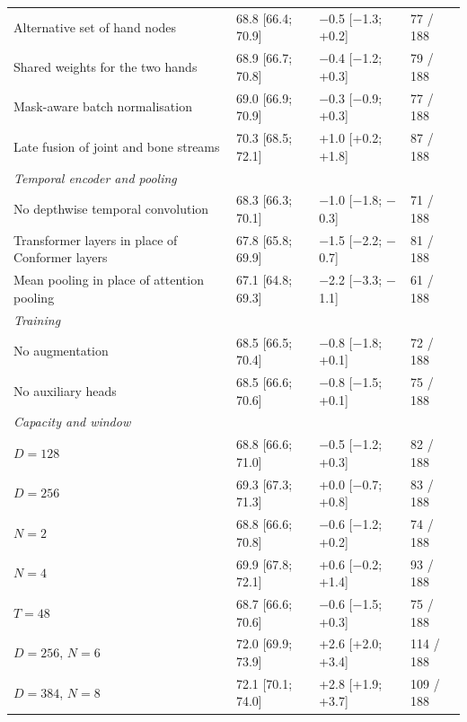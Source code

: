 \documentclass[a4paper,10pt]{article}
\begin{document}
\begin{table}[H]
\begin{tabular}{llll}
Alternative set of hand nodes & 68.8 [66.4; 70.9] & $-$0.5 [$-$1.3; +0.2] & 77 / 188 \\
Shared weights for the two hands & 68.9 [66.7; 70.8] & $-$0.4 [$-$1.2; +0.3] & 79 / 188 \\
Mask-aware batch normalisation & 69.0 [66.9; 70.9] & $-$0.3 [$-$0.9; +0.3] & 77 / 188 \\
Late fusion of joint and bone streams & 70.3 [68.5; 72.1] & +1.0 [+0.2; +1.8] & 87 / 188 \\
\multicolumn{4}{l}{\textit{Temporal encoder and pooling}} \\
No depthwise temporal convolution & 68.3 [66.3; 70.1] & $-$1.0 [$-$1.8; $-$0.3] & 71 / 188 \\
Transformer layers in place of Conformer layers & 67.8 [65.8; 69.9] & $-$1.5 [$-$2.2; $-$0.7] & 81 / 188 \\
Mean pooling in place of attention pooling & 67.1 [64.8; 69.3] & $-$2.2 [$-$3.3; $-$1.1] & 61 / 188 \\
\multicolumn{4}{l}{\textit{Training}} \\
No augmentation & 68.5 [66.5; 70.4] & $-$0.8 [$-$1.8; +0.1] & 72 / 188 \\
No auxiliary heads & 68.5 [66.6; 70.6] & $-$0.8 [$-$1.5; +0.1] & 75 / 188 \\
\multicolumn{4}{l}{\textit{Capacity and window}} \\
$D = 128$ & 68.8 [66.6; 71.0] & $-$0.5 [$-$1.2; +0.3] & 82 / 188 \\
$D = 256$ & 69.3 [67.3; 71.3] & +0.0 [$-$0.7; +0.8] & 83 / 188 \\
$N = 2$ & 68.8 [66.6; 70.8] & $-$0.6 [$-$1.2; +0.2] & 74 / 188 \\
$N = 4$ & 69.9 [67.8; 72.1] & +0.6 [$-$0.2; +1.4] & 93 / 188 \\
$T = 48$ & 68.7 [66.6; 70.6] & $-$0.6 [$-$1.5; +0.3] & 75 / 188 \\
$D = 256$, $N = 6$ & 72.0 [69.9; 73.9] & +2.6 [+2.0; +3.4] & 114 / 188 \\
$D = 384$, $N = 8$ & 72.1 [70.1; 74.0] & +2.8 [+1.9; +3.7] & 109 / 188 \\
\bottomrule
\end{tabular}
\end{table}
\end{document}
